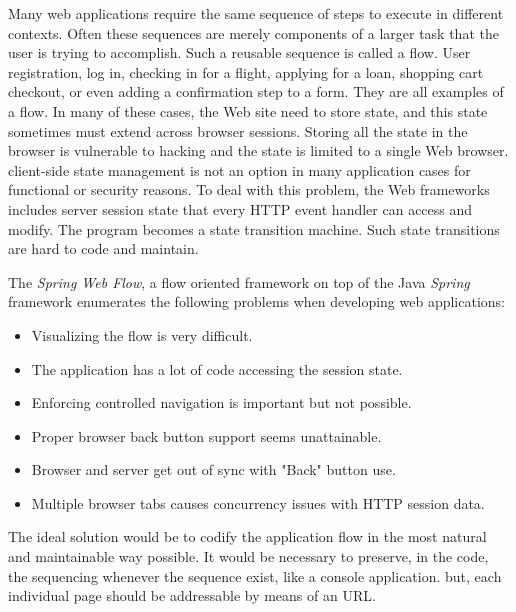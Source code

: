 \documentclass{tmr}
\begin{document}
Many web applications require the same sequence of steps to execute in different contexts. Often these sequences are merely components of a larger task that the user is trying to accomplish. Such a reusable sequence is called a flow. User registration, log in, checking in for a flight, applying for a loan, shopping cart checkout, or even adding a confirmation step to a form. They are all examples of a flow. In many of these cases, the Web site need to store state, and this state sometimes must extend across browser sessions. Storing all the state in the browser is vulnerable to hacking and the state is limited to a single Web browser. client-side state management is not an option in many application cases for functional or security reasons. To deal with this problem, the Web frameworks includes server session state that every HTTP event handler can access and modify. The program 
becomes a state transition machine. Such state transitions are hard to code and maintain. 
 
The \textit{Spring Web Flow}, a flow oriented framework on top of the Java \textit{Spring} framework enumerates the following problems when developing web applications\cite{auth:spring}: 
 
\begin{itemize} 
\item Visualizing the flow is very difficult. 
\item The application has a lot of code accessing the session state. 
\item Enforcing controlled navigation is important but not possible. 
\item Proper browser back button support seems unattainable. 
\item Browser and server get out of sync with "Back" button use. 
\item Multiple browser tabs causes concurrency issues with HTTP session data. 
\end{itemize} 
 
The ideal solution would be to codify the application flow in the most natural and maintainable way possible. It would be necessary to preserve, in the code, the sequencing whenever the sequence exist, like a console application. but, each individual page should be addressable  by means of an URL.
 
\end{document}
